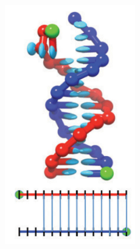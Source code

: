 \begin{figure}[ht]
\begin{centering}
\begin{subfigure}[t]{\dimexpr.15\linewidth-1.3em\relax}
  \includegraphics[width=.8\linewidth,valign=t]{Figures/hybridDiag5.png}
  \end{subfigure}
  \hspace{-0.5cm}
  \begin{subfigure}[t]{\dimexpr.2\linewidth-1.3em\relax}
  \centering

\end{subfigure}
\end{centering}
\end{figure}
